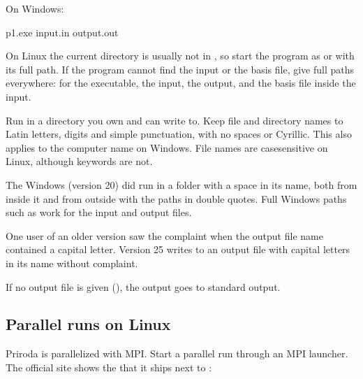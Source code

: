 \documentclass[letterpaper,10pt,english,openany,oneside]{sphinxmanual}
\begin{document}
\sphinxAtStartPar
On Windows:

\begin{sphinxVerbatim}[commandchars=\\\{\}]
p1.exe input.in output.out
\end{sphinxVerbatim}



\sphinxAtStartPar
On Linux the current directory is usually not in , so start the program as  or with its full path. If the
program cannot find the input or the basis file, give full paths everywhere: for the executable, the input, the
output, and the basis file inside the input.



\sphinxAtStartPar
Run in a directory you own and can write to. Keep file and directory names to Latin letters, digits and simple
punctuation, with no spaces or Cyrillic. This also applies to the computer name on Windows. File names are
case\sphinxhyphen{}sensitive on Linux, although keywords are not.



\sphinxAtStartPar
The Windows  (version 20) did run in a folder with a space in its name, both from inside it and from outside
with the paths in double quotes. Full Windows paths such as  work for the input and output files.



\sphinxAtStartPar
One user of an older version saw the complaint  when the output file name contained a
capital letter. Version 25 writes to an output file with capital letters in its name without complaint.



\sphinxAtStartPar
If no output file is given (), the output goes to standard output. 


\subsection{Parallel runs on Linux}
\label{\detokenize{start/running:parallel-runs-on-linux}}
\sphinxAtStartPar
Priroda is parallelized with MPI. Start a parallel run through an MPI launcher. The official site shows the
 that it ships next to :
\end{document}

